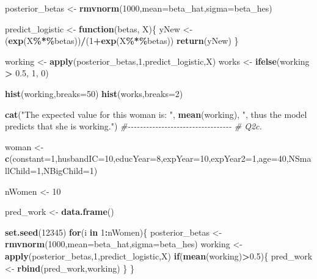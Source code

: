 \documentclass[]{article}
\newenvironment{Shaded}{\begin{snugshade}}{\end{snugshade}}
\newcommand{\CommentTok}[1]{\textcolor[rgb]{0.56,0.35,0.01}{\textit{#1}}}
\newcommand{\ControlFlowTok}[1]{\textcolor[rgb]{0.13,0.29,0.53}{\textbf{#1}}}
\newcommand{\DataTypeTok}[1]{\textcolor[rgb]{0.13,0.29,0.53}{#1}}
\newcommand{\DecValTok}[1]{\textcolor[rgb]{0.00,0.00,0.81}{#1}}
\newcommand{\FloatTok}[1]{\textcolor[rgb]{0.00,0.00,0.81}{#1}}
\newcommand{\KeywordTok}[1]{\textcolor[rgb]{0.13,0.29,0.53}{\textbf{#1}}}
\newcommand{\NormalTok}[1]{#1}
\newcommand{\OperatorTok}[1]{\textcolor[rgb]{0.81,0.36,0.00}{\textbf{#1}}}
\newcommand{\StringTok}[1]{\textcolor[rgb]{0.31,0.60,0.02}{#1}}
\begin{document}
\begin{Shaded}
\begin{Highlighting}[]
\NormalTok{posterior\_betas \textless{}{-}}\StringTok{ }\KeywordTok{rmvnorm}\NormalTok{(}\DecValTok{1000}\NormalTok{,}\DataTypeTok{mean=}\NormalTok{beta\_hat,}\DataTypeTok{sigma=}\NormalTok{beta\_hes)}

\NormalTok{predict\_logistic \textless{}{-}}\StringTok{ }\ControlFlowTok{function}\NormalTok{(betas, X)\{}
\NormalTok{  yNew \textless{}{-}}\StringTok{ }\NormalTok{(}\KeywordTok{exp}\NormalTok{(X}\OperatorTok{\%*\%}\NormalTok{betas))}\OperatorTok{/}\NormalTok{(}\DecValTok{1}\OperatorTok{+}\KeywordTok{exp}\NormalTok{(X}\OperatorTok{\%*\%}\NormalTok{betas))}
  \KeywordTok{return}\NormalTok{(yNew)}
\NormalTok{\}}

\NormalTok{working \textless{}{-}}\StringTok{ }\KeywordTok{apply}\NormalTok{(posterior\_betas,}\DecValTok{1}\NormalTok{,predict\_logistic,X)}
\NormalTok{works \textless{}{-}}\StringTok{ }\KeywordTok{ifelse}\NormalTok{(working }\OperatorTok{\textgreater{}}\StringTok{ }\FloatTok{0.5}\NormalTok{, }\DecValTok{1}\NormalTok{, }\DecValTok{0}\NormalTok{)}

\KeywordTok{hist}\NormalTok{(working,}\DataTypeTok{breaks=}\DecValTok{50}\NormalTok{)}
\KeywordTok{hist}\NormalTok{(works,}\DataTypeTok{breaks=}\DecValTok{2}\NormalTok{)}

\KeywordTok{cat}\NormalTok{(}\StringTok{"The expected value for this woman is: "}\NormalTok{, }\KeywordTok{mean}\NormalTok{(working), }\StringTok{", thus the model predicts that she is working."}\NormalTok{)}
\CommentTok{\#{-}{-}{-}{-}{-}{-}{-}{-}{-}{-}{-}{-}{-}{-}{-}{-}{-}{-}{-}{-}{-}{-}{-}{-}{-}{-}{-}{-}{-}{-}{-}{-}{-}{-}}
\CommentTok{\# Q2c.}

\NormalTok{woman \textless{}{-}}\StringTok{ }\KeywordTok{c}\NormalTok{(}\DataTypeTok{constant=}\DecValTok{1}\NormalTok{,}\DataTypeTok{husbandIC=}\DecValTok{10}\NormalTok{,}\DataTypeTok{educYear=}\DecValTok{8}\NormalTok{,}\DataTypeTok{expYear=}\DecValTok{10}\NormalTok{,}\DataTypeTok{expYear2=}\DecValTok{1}\NormalTok{,}\DataTypeTok{age=}\DecValTok{40}\NormalTok{,}\DataTypeTok{NSmallChild=}\DecValTok{1}\NormalTok{,}\DataTypeTok{NBigChild=}\DecValTok{1}\NormalTok{)}

\NormalTok{nWomen \textless{}{-}}\StringTok{ }\DecValTok{10}

\NormalTok{pred\_work \textless{}{-}}\StringTok{ }\KeywordTok{data.frame}\NormalTok{()}

\KeywordTok{set.seed}\NormalTok{(}\DecValTok{12345}\NormalTok{)}
\ControlFlowTok{for}\NormalTok{(i }\ControlFlowTok{in} \DecValTok{1}\OperatorTok{:}\NormalTok{nWomen)\{}
\NormalTok{  posterior\_betas \textless{}{-}}\StringTok{ }\KeywordTok{rmvnorm}\NormalTok{(}\DecValTok{1000}\NormalTok{,}\DataTypeTok{mean=}\NormalTok{beta\_hat,}\DataTypeTok{sigma=}\NormalTok{beta\_hes)}
\NormalTok{  working \textless{}{-}}\StringTok{ }\KeywordTok{apply}\NormalTok{(posterior\_betas,}\DecValTok{1}\NormalTok{,predict\_logistic,X)}
  \ControlFlowTok{if}\NormalTok{(}\KeywordTok{mean}\NormalTok{(working)}\OperatorTok{\textgreater{}}\FloatTok{0.5}\NormalTok{)\{}
\NormalTok{    pred\_work \textless{}{-}}\StringTok{ }\KeywordTok{rbind}\NormalTok{(pred\_work,working)}
\NormalTok{  \}}
\NormalTok{\}}


\end{Highlighting}
\end{Shaded}
\end{document}
